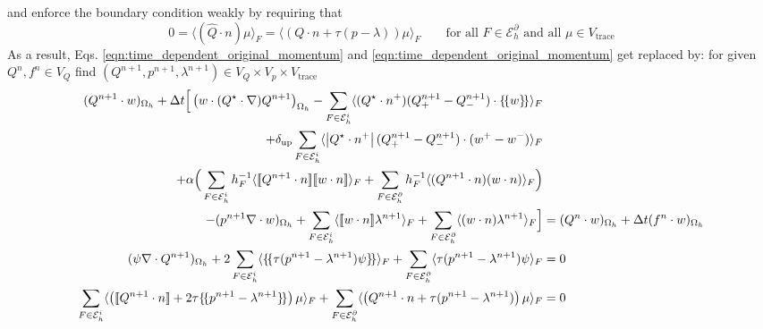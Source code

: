 \documentclass[11pt]{article}
\newcommand{\jump}[1]{[\![ #1]\!]}
\newcommand{\avg}[1]{\{\!\{#1\}\!\}}
\begin{document}
and enforce the boundary condition weakly by requiring that
\begin{equation}
    0 = \langle (\widehat{Q}\cdot n) \mu \rangle_F = \langle (Q\cdot n + \tau(p-\lambda))\mu \rangle_F \qquad \text{for all $F\in\mathcal{E}_h^\partial$ and all $\mu\in V_{\text{trace}}$}\label{eqn:jump_condition_boundary}
\end{equation}
As a result, Eqs. \eqref{eqn:time_dependent_original_momentum} and \eqref{eqn:time_dependent_original_momentum} get replaced by: for given $Q^n,f^n\in V_Q$ find
$(Q^{n+1},p^{n+1},\lambda^{n+1})\in V_Q\times V_p\times V_{\text{trace}}$
\begin{subequations}
    \begin{align}
        (Q^{n+1}\cdot w)_{\Omega_h} + \Delta t\Big[  \left(w\cdot (Q^\star\cdot \nabla) Q^{n+1}\right)_{\Omega_h}  -\sum_{F\in\mathcal{E}_h^i} \langle (Q^\star \cdot n^+)(Q^{n+1}_+ - Q^{n+1}_-)\cdot \avg{w}\rangle_F                              &
        \notag                                                                                                                                                                                                                                                                                                             \\
        +\delta_{\text{up}}\sum_{F\in\mathcal{E}_h^i} \langle \left|Q^\star \cdot n^+\right|(Q^{n+1}_+ - Q^{n+1}_-)\cdot (w^+-w^-)\rangle_F                                                                                                          & \label{eqn:time_dependent_hdg_momentum}                             \\
        + \alpha \Big(\sum_{F\in\mathcal{E}_h^i} h_F^{-1}\langle \jump{Q^{n+1}\cdot n} \jump{w\cdot n}\rangle_F                                      +  \sum_{F\in\mathcal{E}_h^\partial} h_F^{-1}\langle (Q^{n+1}\cdot n) (w\cdot n)\rangle_F \Big) & \notag                                                              \\
        - (p^{n+1} \nabla\cdot w)_{\Omega_h} +  \sum_{F\in\mathcal{E}_h^i} \langle \jump{w\cdot n}\lambda^{n+1}\rangle_{F}  +  \sum_{F\in\mathcal{E}_h^\partial} \langle (w\cdot n)\lambda^{n+1}\rangle_{F}     \Big]                                & = (Q^n\cdot w)_{\Omega_h} + \Delta t (f^n\cdot w)_{\Omega_h} \notag \\
        (\psi \nabla\cdot Q^{n+1})_{\Omega_h} + 2 \sum_{F\in\mathcal{E}_h^i} \langle \avg{\tau (p^{n+1}-\lambda^{n+1})\psi}\rangle_{F}            + \sum_{F\in\mathcal{E}_h^\partial} \langle \tau (p^{n+1}-\lambda^{n+1})\psi\rangle_{F}            & = 0  \label{eqn:time_dependent_hdg_continuity}                      \\
        \sum_{F\in\mathcal{E}_h^i} \langle \left(\jump{Q^{n+1}\cdot n}+2\tau \avg{p^{n+1}-\lambda^{n+1}}\right)\mu \rangle_{F} + \sum_{F\in\mathcal{E}_h^\partial} \langle \left(Q^{n+1}\cdot n+\tau (p^{n+1}-\lambda^{n+1})\right)\mu \rangle_{F}   & = 0\label{eqn:time_dependent_hdg_trace}
    \end{align}
\end{subequations}
\end{document}
